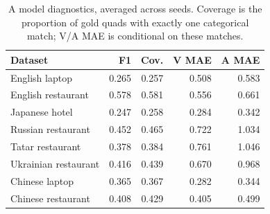 \begin{table}[t]
\centering\small
\caption{A model diagnostics, averaged across seeds. Coverage is the proportion of gold quads with exactly one categorical match; V/A MAE is conditional on these matches.}\label{tab:diag}
\begin{tabular}{lrrrr}
\toprule
Dataset & F1 & Cov. & V MAE & A MAE \\
\midrule
English laptop & 0.265 & 0.257 & 0.508 & 0.583 \\
English restaurant & 0.578 & 0.581 & 0.556 & 0.661 \\
Japanese hotel & 0.247 & 0.258 & 0.284 & 0.342 \\
Russian restaurant & 0.452 & 0.465 & 0.722 & 1.034 \\
Tatar restaurant & 0.378 & 0.384 & 0.761 & 1.046 \\
Ukrainian restaurant & 0.416 & 0.439 & 0.670 & 0.968 \\
Chinese laptop & 0.365 & 0.367 & 0.282 & 0.344 \\
Chinese restaurant & 0.408 & 0.429 & 0.405 & 0.499 \\
\bottomrule
\end{tabular}
\end{table}
